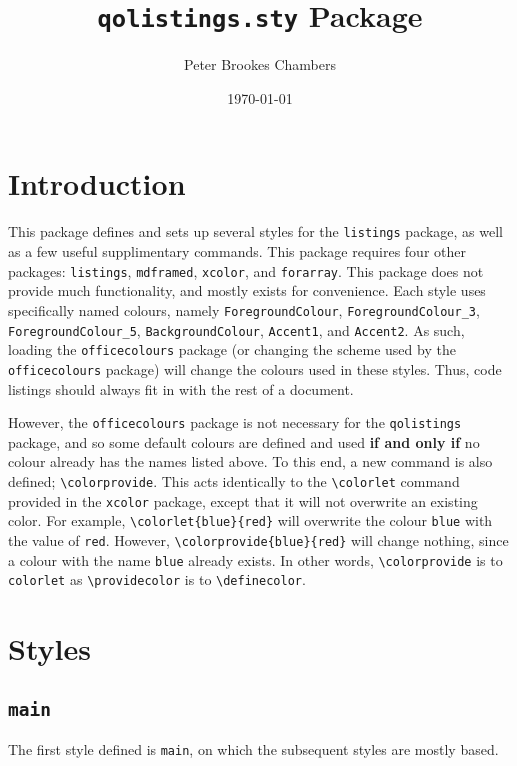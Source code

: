 \documentclass{article}
\title{\texttt{qolistings.sty} Package}
\author{Peter Brookes Chambers}
\date{\today{}}
\begin{document}
\maketitle
\clearpage
\tableofcontents{}
\clearpage
{}
\section{Introduction}

This package defines and sets up several styles for the \texttt{listings} package, as well as a few useful supplimentary commands. This package requires four other packages: \texttt{listings}, \texttt{mdframed}, \texttt{xcolor}, and \texttt{forarray}. This package does not provide much functionality, and mostly exists for convenience. Each style uses specifically named colours, namely \texttt{ForegroundColour}, \texttt{ForegroundColour\_3}, \texttt{ForegroundColour\_5}, \texttt{BackgroundColour}, \texttt{Accent1}, and \texttt{Accent2}. As such, loading the \texttt{officecolours} package (or changing the scheme used by the \texttt{officecolours} package) will change the colours used in these styles. Thus, code listings should always fit in with the rest of a document.

However, the \texttt{officecolours} package is not necessary for the \texttt{qolistings} package, and so some default colours are defined and used \textbf{if and only if} no colour already has the names listed above. To this end, a new command is also defined; \verb|\colorprovide|. This acts identically to the \verb|\colorlet| command provided in the \texttt{xcolor} package, except that it will not overwrite an existing color. For example, \verb|\colorlet{blue}{red}| will overwrite the colour \texttt{blue} with the value of \texttt{red}. However, \verb|\colorprovide{blue}{red}| will change nothing, since a colour with the name \texttt{blue} already exists. In other words, \verb|\colorprovide| is to \verb|colorlet| as \verb|\providecolor| is to \verb|\definecolor|.

\section{Styles}

\subsection{\texttt{main}}
The first style defined is \texttt{main}, on which the subsequent styles are mostly based.



\lipsum[1-2]
\end{document}
